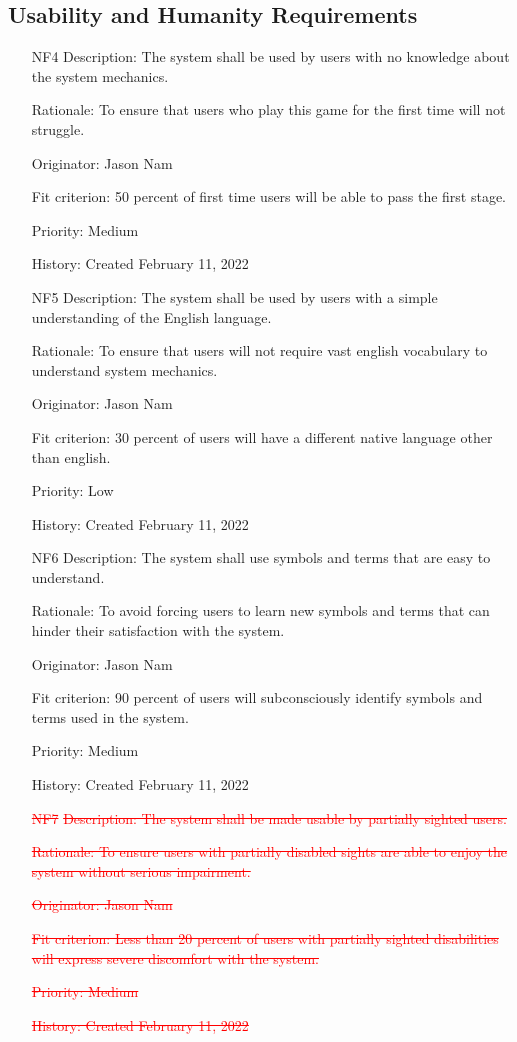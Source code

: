 \documentclass[12pt, titlepage]{article}
\begin{document}
\subsection{Usability and Humanity Requirements}

\begin{itemize}
    \item[NF4]
Description: The system shall be used by users with no knowledge about the system mechanics.

Rationale: To ensure that users who play this game for the first time will not struggle.

Originator: Jason Nam

Fit criterion: 50 percent of first time users will be able to pass the first stage.

Priority: Medium

History: Created February 11, 2022

    \item[NF5]
Description: The system shall be used by users with a simple understanding of the English language.

Rationale: To ensure that users will not require vast english vocabulary to understand system mechanics.

Originator: Jason Nam

Fit criterion: 30 percent of users will have a different native language other than english.

Priority: Low

History: Created February 11, 2022

    \item[NF6]
Description: The system shall use symbols and terms that are easy to understand.

Rationale: To avoid forcing users to learn new symbols and terms that can hinder their satisfaction with the system.

Originator: Jason Nam

Fit criterion: 90 percent of users will subconsciously identify symbols and terms used in the system.

Priority: Medium

History: Created February 11, 2022

    \item[\textcolor{red}{\st{NF7}}]
\textcolor{red}{\st{Description: The system shall be made usable by partially sighted users.}}

\textcolor{red}{\st{Rationale: To ensure users with partially disabled sights are able to enjoy the system without serious impairment.}}

\textcolor{red}{\st{Originator: Jason Nam}}

\textcolor{red}{\st{Fit criterion: Less than 20 percent of users with partially sighted disabilities will express severe discomfort with the system.}}

\textcolor{red}{\st{Priority: Medium}}

\textcolor{red}{\st{History: Created February 11, 2022}}

\end{itemize}
\end{document}
